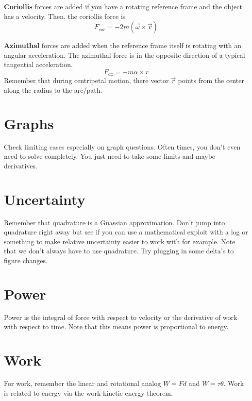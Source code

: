 \documentclass{article}
\begin{document}
    \textbf{Coriollis} forces are added if you have a rotating reference frame and the object has a velocity. Then, 
    the coriollis force is
    $$F_{cor}=-2m(\vec{\omega}\times \vec{v})$$

    \textbf{Azimuthal} forces are added when the reference frame itself is rotating with an angular acceleration. The azimuthal
    force is in the opposite direction of a typical tangential acceleration.
    $$F_{az}=-m\alpha\times r$$
    Remember that during centripetal motion, there vector $\vec{r}$ points from the center along the radius to the arc/path.

\section{Graphs}
    Check limiting cases especially on graph questions. Often times, you don't even need
    to solve completely. You just need to take some limits and maybe derivatives.

\section{Uncertainty}
    Remember that quadrature is a Guassian approximation. Don't jump into quadrature right away but see if you can use a mathematical
    exploit with a log or something to make relative uncertainty easier to work with for example. Note that we don't always have to use 
    quadrature. Try plugging in some delta's to figure changes.

\section{Power}
    Power is the integral of force with respect to velocity or the derivative of work with respect to time. Note that this means power 
    is proportional to energy.

\section{Work}
    For work, remember the linear and rotational analog $W=Fd$ and $W=\tau\theta$. Work is related to energy via the work-kinetic energy
    theorem.
\end{document}

